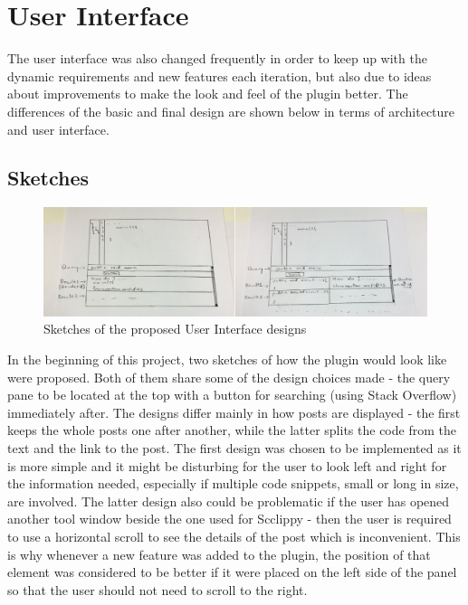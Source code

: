 \documentclass{l4proj}
\begin{document}
\section{User Interface}
The user interface was also changed frequently in order to keep up with the dynamic requirements and new features each iteration, but also due to ideas about improvements to make the look and feel of the plugin better. The differences of the basic and final design are shown below in terms of architecture and user interface.

\subsection{Sketches}

\begin{figure}[H]
\includegraphics[scale=0.2]{sketches}
\centering
\caption{Sketches of the proposed User Interface designs}\label{sketches}
\label{fig:sketches}
\end{figure}

In the beginning of this project, two sketches of how the plugin would look like were proposed. Both of them share some of the design choices made - the query pane to be located at the top with a button for searching (using Stack Overflow) immediately after. The designs differ mainly in how posts are displayed - the first keeps the whole posts one after another, while the latter splits the code from the text and the link to the post. The first design was chosen to be implemented as it is more simple and it might be disturbing for the user to look left and right for the information needed, especially if multiple code snippets, small or long in size, are involved. The latter design also could be problematic if the user has opened another tool window beside the one used for Scclippy - then the user is required to use a horizontal scroll to see the details of the post which is inconvenient. This is why whenever a new feature was added to the plugin, the position of that element was considered to be better if it were placed on the left side of the panel so that the user should not need to scroll to the right.
\end{document}
